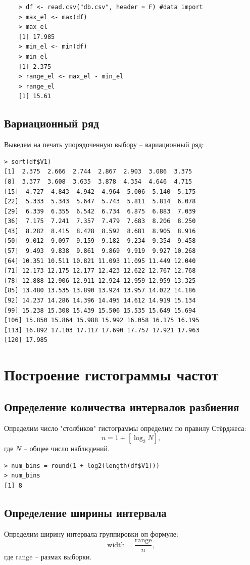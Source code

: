 \documentclass[14pt,a4paper]{scrartcl}
\begin{document}
\begin{lstlisting}
	> df <- read.csv("db.csv", header = F) #data import
	> max_el <- max(df)
	> max_el
	[1] 17.985
	> min_el <- min(df)
	> min_el
	[1] 2.375
	> range_el <- max_el - min_el
	> range_el
	[1] 15.61
\end{lstlisting}
\subsection{Вариационный ряд}
Выведем на печать упорядоченную выбору -- вариационный ряд:
\begin{lstlisting}
> sort(df$V1)
[1]  2.375  2.666  2.744  2.867  2.903  3.086  3.375
[8]  3.377  3.608  3.635  3.878  4.354  4.646  4.715
[15]  4.727  4.843  4.942  4.964  5.006  5.140  5.175
[22]  5.333  5.343  5.647  5.743  5.811  5.814  6.078
[29]  6.339  6.355  6.542  6.734  6.875  6.883  7.039
[36]  7.175  7.241  7.357  7.479  7.683  8.206  8.250
[43]  8.282  8.415  8.428  8.592  8.681  8.905  8.916
[50]  9.012  9.097  9.159  9.182  9.234  9.354  9.458
[57]  9.493  9.838  9.861  9.869  9.919  9.927 10.268
[64] 10.351 10.511 10.821 11.093 11.095 11.449 12.040
[71] 12.173 12.175 12.177 12.423 12.622 12.767 12.768
[78] 12.888 12.906 12.911 12.924 12.959 12.959 13.325
[85] 13.480 13.535 13.890 13.924 13.957 14.022 14.186
[92] 14.237 14.286 14.396 14.495 14.612 14.919 15.134
[99] 15.238 15.308 15.439 15.506 15.535 15.649 15.694
[106] 15.850 15.864 15.988 15.992 16.058 16.175 16.195
[113] 16.892 17.103 17.117 17.690 17.757 17.921 17.963
[120] 17.985
\end{lstlisting}

\section{Построение гистограммы частот}
\subsection{Определение количества интервалов разбиения}
Определим число "столбиков" гистограммы определим по правилу Стёрджеса:
\begin{equation*}
	n = 1 + [\log_2{N}],
\end{equation*}
где $N$ -- общее число наблюдений.


\begin{lstlisting}
> num_bins = round(1 + log2(length(df$V1)))
> num_bins
[1] 8
\end{lstlisting}

\subsection{Определение ширины интервала}
Определим ширину интервала группировки оп формуле:
\begin{equation*}
	\text{width} = \frac{\text{range}}{n},
\end{equation*}
где $\text{range}$ -- размах выборки.
\end{document}
